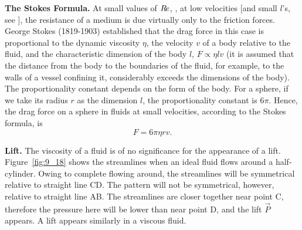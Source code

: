 \textbf{The Stokes Formula.} At small values of $R\hspace{-1pt}e$, \ie, at low velocities [and small $l$'s, see ], the resistance of a medium is due virtually only to the friction forces. George Stokes (1819-1903) established that the drag force in this case is proportional to the dynamic viscosity $\eta$, the velocity $v$ of a body relative to the fluid, and the characteristic dimension of the body $l$, \ie $F\propto\eta lv$ (it is assumed that the distance from the body to the boundaries of the fluid, for example, to the walls of a vessel confining it, considerably exceeds the dimensions of the body). The proportionality constant depends on the form of the body. For a sphere, if we take its radius $r$ as the dimension $l$, the proportionality constant is $6\pi$. Hence, the drag force on a sphere in fluids at small velocities, according to the Stokes formula, is
\begin{equation}\label{eq:9_24}
	F = 6\pi\eta rv.
\end{equation}

\textbf{Lift.} The viscosity of a fluid is of no significance for the appearance of a lift. Figure~\ref{fig:9_18} shows the streamlines when an ideal fluid flows around a half-cylinder. Owing to complete flowing around, the streamlines will be symmetrical relative to straight line CD. The pattern will not be symmetrical, however, relative to straight line AB. The streamlines are closer together near point C, therefore the pressure here will be lower than near point D, and the lift $\vec{P}$ appears. A lift appears similarly in a viscous fluid.

